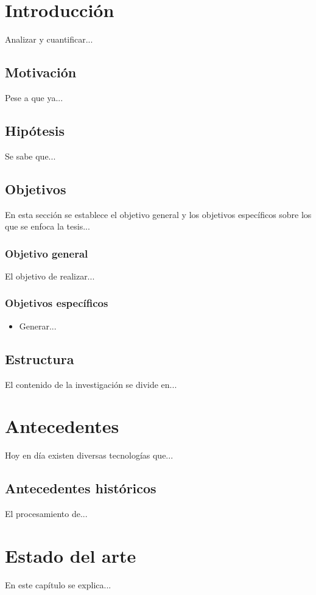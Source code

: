 \chapter{Introducción}
Analizar y cuantificar...
\clearpage

\section{Motivación}
Pese a que ya...

\section{Hipótesis}
Se sabe que...

\section{Objetivos}
En esta sección se establece el objetivo general y los objetivos específicos sobre los que se enfoca la tesis...

\subsection{Objetivo general}
El objetivo de realizar...

\subsection{Objetivos específicos}
\begin{itemize}
\item Generar...
\end{itemize}

\section{Estructura}
El contenido de la investigación se divide en...


\chapter{Antecedentes}
Hoy en día existen diversas tecnologías que...

\section{Antecedentes históricos}
El procesamiento de...


\chapter{Estado del arte}
En este capítulo se explica...

